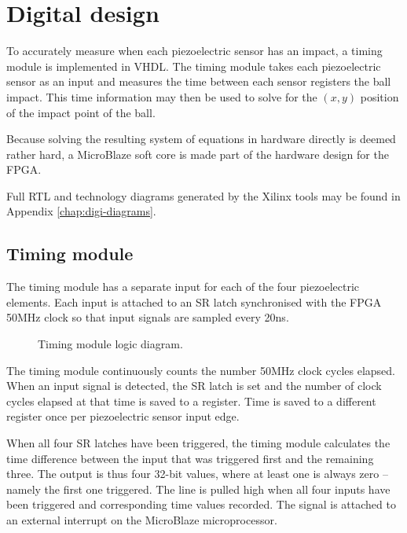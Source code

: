 \chapter{Digital design}
\label{cha:digidesign}

To accurately measure when each piezoelectric sensor has an impact, %
a timing module is implemented in VHDL.
The timing module takes each piezoelectric sensor as an input and measures the time between each sensor registers the ball impact.
This time information may then be used to solve for the $(x,y)$ position of the impact point of the ball.

Because solving the resulting system of equations in hardware directly is deemed rather hard, %
 a MicroBlaze soft core is made part of the hardware design for the FPGA.

 Full RTL and technology diagrams generated by the Xilinx tools may be found in Appendix \ref{chap:digi-diagrams}.

\section{Timing module}
\label{sec:timing_module}
The timing module has a separate input for each of the four piezoelectric elements.
Each input is attached to an SR latch synchronised with the FPGA 50\si{MHz} clock so that input signals are sampled every 20\si{ns}.

\begin{figure}[htb]
    \centering
    
    \caption{Timing module logic diagram.}
    \label{fig:timing}
\end{figure}

The timing module continuously counts the number 50\si{MHz} clock cycles elapsed.
When an input signal is detected, the SR latch is set and the number of clock cycles elapsed at that time is saved to a register.
Time is saved to a different register once per piezoelectric sensor input edge.

When all four SR latches have been triggered, the timing module calculates the time difference between the input that was triggered first and the remaining three.
The output is thus four 32-bit values, where at least one is always zero -- namely the first one triggered.
The line  is pulled high when all four inputs have been triggered and corresponding time values recorded.
The  signal is attached to an external interrupt on the MicroBlaze microprocessor.

